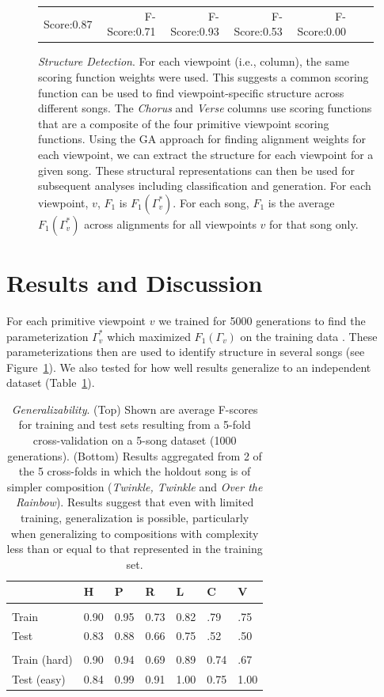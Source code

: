 \documentclass[phd,electronic,oneside,twosidetoc,letterpaper,chaptercenter,parttop,lof,lot]{byumsphd}
\begin{document}
\begin{figure}[t!]
\begin{tabular}{CDDDDDD}
Score:0.87 & F-Score:0.71 & F-Score:0.93 & F-Score:0.53 & F-Score:0.00 \\
\end{tabular}
\caption{\label{fig:song_v_viewpoint}\textit{Structure Detection}. For each viewpoint (i.e., column), the same scoring function weights were used. This suggests a common scoring function can be used to find viewpoint-specific structure across different songs. The \textit{Chorus} and \textit{Verse} columns use scoring functions that are a composite of the four primitive viewpoint scoring functions. Using the GA approach for finding alignment weights for each viewpoint, we can extract the structure for each viewpoint for a given song. These structural representations can then be used for subsequent analyses including classification and generation. For each viewpoint, $v$, $F_{1}$ is $F_{1}(\Gamma^*_v)$. For each song, $F_{1}$ is the average $F_{1}(\Gamma^*_v)$ across alignments for all viewpoints $v$ for that song only.}
\end{figure}

\section{Results and Discussion}

For each primitive viewpoint $v$ we trained for 5000 generations to find the parameterization $\Gamma^*_v$ which maximized $F_1(\Gamma_v)$ on the training data%
. These parameterizations then are used to identify structure in several songs (see Figure~\ref{fig:song_v_viewpoint}). We also tested for how well results generalize to an independent dataset (Table~\ref{tab:generalization}).

\begin{table}
\centering
\begin{tabular}{lllllll}
                     & H & P & R & L & C & V \\
\hline \\ [-1.5ex]
Train & 0.90    & 0.95  & 0.73   & 0.82  & .79  & .75     \\
Test     & 0.83    & 0.88  & 0.66   & 0.75  & .52      & .50  \\ 
\hline \\ [-1.5ex]
Train (hard) & 0.90    & 0.94  & 0.69   & 0.89  & 0.74   & .67   \\
Test (easy)     & 0.84    & 0.99  & 0.91   & 1.00  & 0.75   & 1.00 \\
\hline
\end{tabular}
\caption{\textit{Generalizability}. (Top) Shown are average F-scores for training and test sets resulting from a 5-fold cross-validation on a 5-song dataset (1000 generations). (Bottom) Results aggregated from 2 of the 5 cross-folds in which the holdout song is of simpler composition (\textit{Twinkle, Twinkle} and \textit{Over the Rainbow}). Results suggest that even with limited training, generalization is possible, particularly when generalizing to compositions with complexity less than or equal to that represented in the training set.}
\label{tab:generalization}
\end{table}
\end{document}
